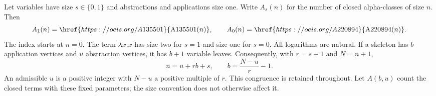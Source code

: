 \documentclass[11pt,a4paper]{article}
\numberwithin{equation}{section}
\theoremstyle{remark}
\begin{document}
Let variables have size $s\in\{0,1\}$ and abstractions and applications size one. Write $A_s(n)$ for the number of closed alpha-classes of size $n$. Then
\[
 A_1(n)=\href{https://oeis.org/A135501}{\mathrm{A135501}(n)},\qquad
 A_0(n)=\href{https://oeis.org/A220894}{\mathrm{A220894}(n)}.
\]
The index starts at $n=0$. The term $\lambda x.x$ has size two for $s=1$ and size one for $s=0$. All logarithms are natural. If a skeleton has $b$ application vertices and $u$ abstraction vertices, it has $b+1$ variable leaves. Consequently, with $r=s+1$ and $N=n+1$,
\begin{equation}\label{lam:ao:eq:size}
 n=u+rb+s,\qquad b=\frac{N-u}{r}-1.
\end{equation}
An admissible $u$ is a positive integer with $N-u$ a positive multiple of $r$. This congruence is retained throughout. Let $A(b,u)$ count the closed terms with these fixed parameters; the size convention does not otherwise affect it.
\end{document}
